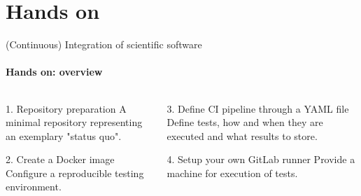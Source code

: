 \section{Hands on}

\begin{frame}{(Continuous) Integration of scientific software}
    \framesubtitle{Hands on: overview}
    \begin{columns}
    \begin{column}{0.48\textwidth}
        \begin{exampleblock}{1. Repository preparation}
            A minimal repository representing an exemplary
            "status quo".
        \end{exampleblock}
        \begin{block}{2. Create a Docker image}
            Configure a reproducible testing environment.
        \end{block}
    \end{column}

    \begin{column}{0.48\textwidth}
        \begin{block}{3. Define CI pipeline through a YAML file}
            Define tests, how and when they are executed and what
            results to store.
        \end{block}
        \begin{block}{4. Setup your own GitLab runner}
            Provide a machine for execution of tests.
        \end{block}
    \end{column}
    \end{columns}
\end{frame}
